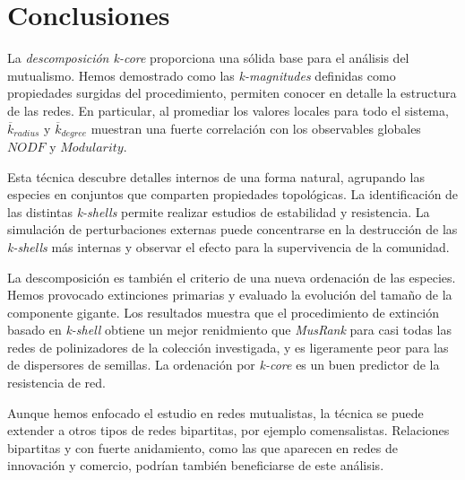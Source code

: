\section{Conclusiones}

La \textit{descomposición k-core} proporciona una sólida base para el análisis del mutualismo. Hemos demostrado como las \textit{k-magnitudes} definidas como propiedades surgidas del procedimiento, permiten conocer en detalle la estructura de las redes. En particular, al promediar los valores locales para todo el sistema, $\overline {k}_{radius}$ y $\overline {k}_{degree}$ muestran una fuerte correlación con los observables globales $NODF$ y $Modularity$. 

Esta técnica descubre detalles internos de una forma natural, agrupando las especies en conjuntos que comparten propiedades topológicas. La identificación de las distintas \textit{k-shells} permite realizar estudios de estabilidad y resistencia. La simulación de perturbaciones externas puede concentrarse en la destrucción de las \textit{k-shells} más internas y observar el efecto para la supervivencia de la comunidad. 

La descomposición es también el criterio de una nueva ordenación de las especies. Hemos provocado extinciones primarias y evaluado la evolución del tamaño de la componente gigante. Los resultados muestra que el procedimiento de extinción basado en \textit{k-shell} obtiene un mejor renidmiento que \textit{MusRank} para casi todas las redes de polinizadores de la colección investigada, y es ligeramente peor para las de dispersores de semillas. La ordenación por \textit{k-core} es un buen predictor de la resistencia de red.

Aunque hemos enfocado el estudio en redes mutualistas, la técnica se puede extender a otros tipos de redes bipartitas, por ejemplo comensalistas. Relaciones bipartitas y con fuerte anidamiento, como las que aparecen en redes de innovación y comercio, podrían también beneficiarse de este análisis.